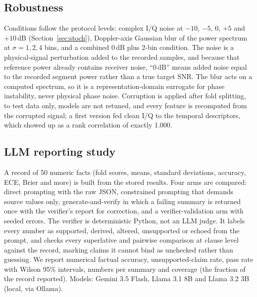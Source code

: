 \documentclass[conference]{IEEEtran}
\begin{document}
\subsection{Robustness}
\label{sec:robust}
Conditions follow the protocol levels: complex I/Q noise at $-10$, $-5$, 0, $+5$ and $+10$\,dB (Section~\ref{sec:stoch}), Doppler-axis Gaussian blur of the power spectrum at $\sigma=1,2,4$ bins, and a combined 0\,dB plus 2-bin condition. The noise is a physical-signal perturbation added to the recorded samples, and because that reference power already contains receiver noise, ``0\,dB'' means added noise equal to the recorded segment power rather than a true target SNR. The blur acts on a computed spectrum, so it is a representation-domain surrogate for phase instability, never physical phase noise. Corruption is applied after fold splitting, to test data only, models are not retuned, and every feature is recomputed from the corrupted signal; a first version fed clean I/Q to the temporal descriptors, which showed up as a rank correlation of exactly 1.000.

\subsection{LLM reporting study}
A record of 50 numeric facts (fold scores, means, standard deviations, accuracy, ECE, Brier and more) is built from the stored results. Four arms are compared: direct prompting with the raw JSON, constrained prompting that demands source values only, generate-and-verify in which a failing summary is returned once with the verifier's report for correction, and a verifier-validation arm with seeded errors. The verifier is deterministic Python, not an LLM judge. It labels every number as supported, derived, altered, unsupported or echoed from the prompt, and checks every superlative and pairwise comparison at clause level against the record, marking claims it cannot bind as unchecked rather than guessing. We report numerical factual accuracy, unsupported-claim rate, pass rate with Wilson 95\% intervals, numbers per summary and coverage (the fraction of the record reported). Models: Gemini 3.5 Flash, Llama 3.1 8B and Llama 3.2 3B (local, via Ollama).
\end{document}
